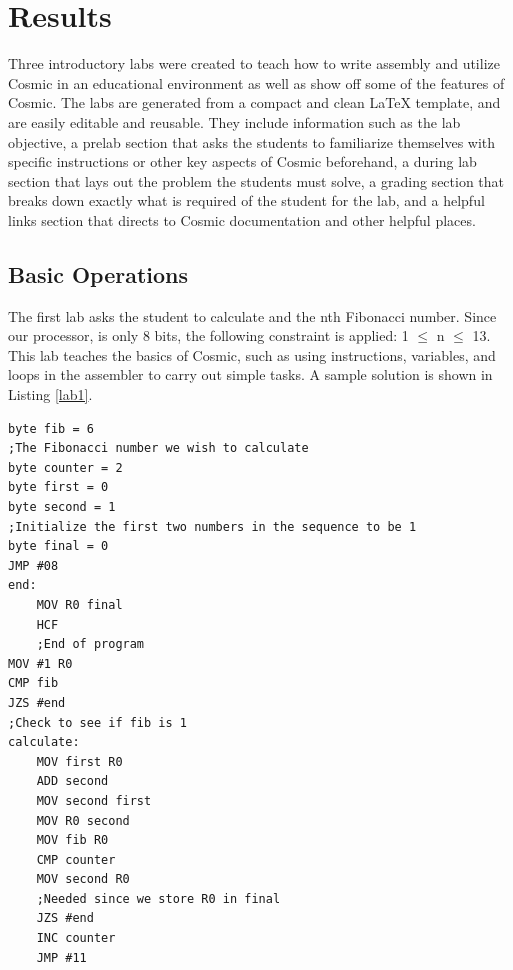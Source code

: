 \documentclass[conference]{IEEEtran}
\begin{document}
\section{Results}
Three introductory labs were created to teach how to write assembly and utilize Cosmic in an educational environment as well as show off some of the features of Cosmic. The labs are generated from a compact and clean LaTeX template, and are easily editable and reusable. They include information such as the lab objective, a prelab section that asks the students to familiarize themselves with specific instructions or other key aspects of Cosmic beforehand, a during lab section that lays out the problem the students must solve, a grading section that breaks down exactly what is required of the student for the lab, and a helpful links section that directs to Cosmic documentation and other helpful places.

\subsection{Basic Operations}
The first lab asks the student to calculate and the nth Fibonacci number. Since our processor, is only 8 bits, the following constraint is applied: 1 $\leq$ n $\leq$ 13. This lab teaches the basics of Cosmic, such as using instructions, variables, and loops in the assembler to carry out simple tasks. A sample solution is shown in Listing \ref{lab1}.

\begin{lstlisting}[caption={Cosmic assembly to find the nth Fibonacci number.}, label = {lab1}]
byte fib = 6
;The Fibonacci number we wish to calculate
byte counter = 2
byte first = 0
byte second = 1
;Initialize the first two numbers in the sequence to be 1
byte final = 0
JMP #08
end:
    MOV R0 final
    HCF
    ;End of program
MOV #1 R0
CMP fib
JZS #end
;Check to see if fib is 1
calculate:
    MOV first R0
    ADD second
    MOV second first
    MOV R0 second
    MOV fib R0
    CMP counter
    MOV second R0
    ;Needed since we store R0 in final
    JZS #end
    INC counter
    JMP #11
\end{lstlisting}
\end{document}
